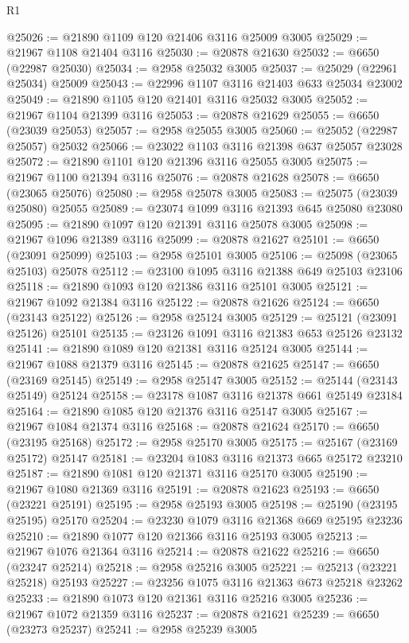 \begin{lexlean}{R1}
\begin{coremodule}
@25026 := @21890 @1109 @120 @21406 @3116 @25009 @3005
@25029 := @21967 @1108 @21404 @3116
@25030 := @20878 @21630
@25032 := @6650 (@22987 @25030)
@25034 := @2958 @25032 @3005
@25037 := @25029 (@22961 @25034) @25009
@25043 := @22996 @1107 @3116 @21403 @633 @25034 @23002
@25049 := @21890 @1105 @120 @21401 @3116 @25032 @3005
@25052 := @21967 @1104 @21399 @3116
@25053 := @20878 @21629
@25055 := @6650 (@23039 @25053)
@25057 := @2958 @25055 @3005
@25060 := @25052 (@22987 @25057) @25032
@25066 := @23022 @1103 @3116 @21398 @637 @25057 @23028
@25072 := @21890 @1101 @120 @21396 @3116 @25055 @3005
@25075 := @21967 @1100 @21394 @3116
@25076 := @20878 @21628
@25078 := @6650 (@23065 @25076)
@25080 := @2958 @25078 @3005
@25083 := @25075 (@23039 @25080) @25055
@25089 := @23074 @1099 @3116 @21393 @645 @25080 @23080
@25095 := @21890 @1097 @120 @21391 @3116 @25078 @3005
@25098 := @21967 @1096 @21389 @3116
@25099 := @20878 @21627
@25101 := @6650 (@23091 @25099)
@25103 := @2958 @25101 @3005
@25106 := @25098 (@23065 @25103) @25078
@25112 := @23100 @1095 @3116 @21388 @649 @25103 @23106
@25118 := @21890 @1093 @120 @21386 @3116 @25101 @3005
@25121 := @21967 @1092 @21384 @3116
@25122 := @20878 @21626
@25124 := @6650 (@23143 @25122)
@25126 := @2958 @25124 @3005
@25129 := @25121 (@23091 @25126) @25101
@25135 := @23126 @1091 @3116 @21383 @653 @25126 @23132
@25141 := @21890 @1089 @120 @21381 @3116 @25124 @3005
@25144 := @21967 @1088 @21379 @3116
@25145 := @20878 @21625
@25147 := @6650 (@23169 @25145)
@25149 := @2958 @25147 @3005
@25152 := @25144 (@23143 @25149) @25124
@25158 := @23178 @1087 @3116 @21378 @661 @25149 @23184
@25164 := @21890 @1085 @120 @21376 @3116 @25147 @3005
@25167 := @21967 @1084 @21374 @3116
@25168 := @20878 @21624
@25170 := @6650 (@23195 @25168)
@25172 := @2958 @25170 @3005
@25175 := @25167 (@23169 @25172) @25147
@25181 := @23204 @1083 @3116 @21373 @665 @25172 @23210
@25187 := @21890 @1081 @120 @21371 @3116 @25170 @3005
@25190 := @21967 @1080 @21369 @3116
@25191 := @20878 @21623
@25193 := @6650 (@23221 @25191)
@25195 := @2958 @25193 @3005
@25198 := @25190 (@23195 @25195) @25170
@25204 := @23230 @1079 @3116 @21368 @669 @25195 @23236
@25210 := @21890 @1077 @120 @21366 @3116 @25193 @3005
@25213 := @21967 @1076 @21364 @3116
@25214 := @20878 @21622
@25216 := @6650 (@23247 @25214)
@25218 := @2958 @25216 @3005
@25221 := @25213 (@23221 @25218) @25193
@25227 := @23256 @1075 @3116 @21363 @673 @25218 @23262
@25233 := @21890 @1073 @120 @21361 @3116 @25216 @3005
@25236 := @21967 @1072 @21359 @3116
@25237 := @20878 @21621
@25239 := @6650 (@23273 @25237)
@25241 := @2958 @25239 @3005

\end{coremodule}
\end{lexlean}
